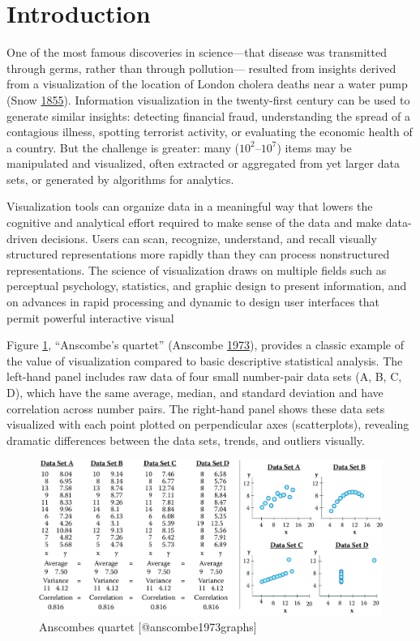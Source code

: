 \documentclass[]{krantz}
\begin{document}
\section{Introduction}\label{sec:viz-1}

One of the most famous discoveries in science---that disease was
transmitted through germs, rather than through pollution--- resulted
from insights derived from a visualization of the location of London
cholera deaths near a water pump (Snow
\protect\hyperlink{ref-snow1855mode}{1855}). Information visualization
in the twenty-first century can be used to generate similar insights:
detecting financial fraud, understanding the spread of a contagious
illness, spotting terrorist activity, or evaluating the economic health
of a country. But the challenge is greater: many
(\(10^{2}\)--\(10^{7}\)) items may be manipulated and visualized, often
extracted or aggregated from yet larger data sets, or generated by
algorithms for analytics.

Visualization tools can organize data in a meaningful way that lowers
the cognitive and analytical effort required to make sense of the data
and make data-driven decisions. Users can scan, recognize, understand,
and recall visually structured representations more rapidly than they
can process nonstructured representations. The science of visualization
draws on multiple fields such as perceptual psychology, statistics, and
graphic design to present information, and on advances in rapid
processing and dynamic to design user interfaces that permit powerful
interactive visual

Figure \ref{fig:fig9-1}, ``Anscombe's quartet'' (Anscombe
\protect\hyperlink{ref-anscombe1973graphs}{1973}), provides a classic
example of the value of visualization compared to basic descriptive
statistical analysis. The left-hand panel includes raw data of four
small number-pair data sets (A, B, C, D), which have the same average,
median, and standard deviation and have correlation across number pairs.
The right-hand panel shows these data sets visualized with each point
plotted on perpendicular axes (scatterplots), revealing dramatic
differences between the data sets, trends, and outliers visually.

\begin{figure}

{\centering \includegraphics[width=0.7\linewidth]{ChapterViz/figures/fig9-1} 

}

\caption{Anscombes quartet [@anscombe1973graphs]}\label{fig:fig9-1}
\end{figure}
\end{document}
